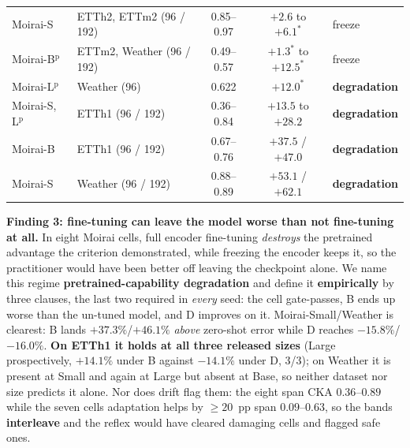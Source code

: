 \documentclass{article}
\begin{document}
\begin{table}[t]
\begin{tabular}{@{}llccl@{}}
Moirai-S & ETTh2, ETTm2 (96 / 192) & 0.85--0.97 & $+2.6$ to $+6.1^{*}$ & freeze \\
Moirai-B$^{\text{p}}$ & ETTm2, Weather (96 / 192) & 0.49--0.57 & $+1.3^{*}$ to $+12.5^{*}$ & freeze \\
Moirai-L$^{\text{p}}$ & Weather (96) & 0.622 & $\mathbf{+12.0}^{*}$ & \textbf{degradation} \\
Moirai-S, L$^{\text{p}}$ & ETTh1 (96 / 192) & 0.36--0.84 & $\mathbf{+13.5}$ to $\mathbf{+28.2}$ & \textbf{degradation} \\
Moirai-B & ETTh1 (96 / 192) & 0.67--0.76 & $\mathbf{+37.5}$ / $\mathbf{+47.0}$ & \textbf{degradation} \\
Moirai-S & Weather (96 / 192) & 0.88--0.89 & $\mathbf{+53.1}$ / $\mathbf{+62.1}$ & \textbf{degradation} \\
\bottomrule
\end{tabular}
\vspace{-4mm}
\end{table}

\textbf{Finding 3: fine-tuning can leave the model worse than not fine-tuning at all.}
In eight Moirai cells, full encoder fine-tuning \emph{destroys} the pretrained advantage the
criterion demonstrated, while freezing the encoder keeps it, so the practitioner would have been
better off leaving the checkpoint alone. We name this regime \textbf{pretrained-capability
degradation} and define it \textbf{empirically} by three clauses, the last two required in
\emph{every} seed: the cell gate-passes, B ends up worse than the un-tuned model, and D improves
on it. Moirai-Small/Weather is clearest: B lands $+37.3\%$/$+46.1\%$ \emph{above}
zero-shot error while D reaches $-15.8\%$/$-16.0\%$. \textbf{On ETTh1 it holds at all three released sizes} (Large prospectively, $+14.1\%$ under B against
$-14.1\%$ under D, 3/3); on Weather it is present at Small and again at Large but absent at Base, so
neither dataset nor size predicts it alone. Nor does drift flag them: the eight span CKA
$0.36$--$0.89$ while the seven cells adaptation helps by ${\ge}20$~pp span $0.09$--$0.63$, so the
bands \textbf{interleave} and the reflex would have cleared damaging cells and flagged safe ones.
\end{document}
